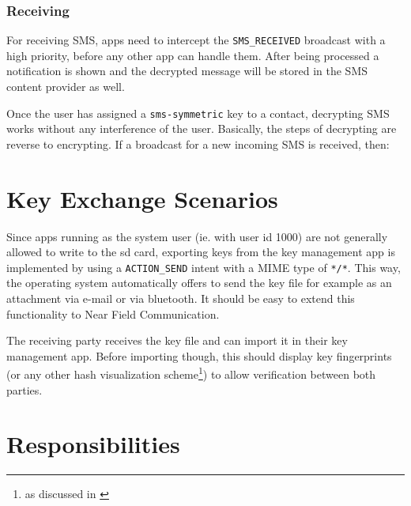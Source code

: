 \documentclass[a4paper]{scrartcl}
\begin{document}
		\subsubsection{Receiving}
      For receiving SMS, apps need to intercept the \texttt{SMS\_RECEIVED} broadcast with a high priority, before any other app can handle them. After being processed a notification is shown and the decrypted message will be stored in the SMS content provider as well.
      
      Once the user has assigned a \texttt{sms-symmetric} key to a contact, decrypting SMS works without any interference of the user. Basically, the steps of decrypting are reverse to encrypting. If a broadcast for a new incoming SMS is received, then:

			\begin{algorithmic}
				\ELSE
				\ENDIF
			\end{algorithmic}

\section{Key Exchange Scenarios}
	Since apps running as the system user (ie. with user id 1000) are not generally allowed to write to the sd card,
	exporting keys from the key management app is implemented by using a \texttt{ACTION\_SEND} intent with a MIME type
	of \texttt{*/*}. This way, the operating system automatically offers to send the key file for example as an attachment
	via e-mail or via bluetooth. It should be easy to extend this functionality to Near Field Communication.

	The receiving party receives the key file and can import it in their key management app. Before importing though,
	this should display key fingerprints (or any other hash visualization scheme\footnote{as discussed in \cite{perrig99}})
	to allow verification between both parties.
	
\section{Responsibilities}
	
\end{document}
